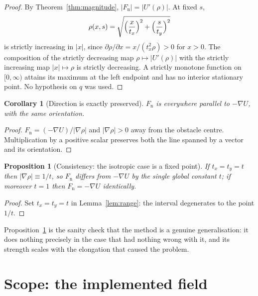 \documentclass[11pt]{article}
\newtheorem{proposition}[theorem]{Proposition}
\newtheorem{corollary}[theorem]{Corollary}
\theoremstyle{remark}
\begin{document}
\begin{proof}
By Theorem~\ref{thm:magnitude}, $|F_{\mathrm{n}}|=|U'(\rho)|$. At fixed $s$,
\begin{equation}
  \rho(x,s)=\sqrt{\Bigl(\frac{x}{t_{x}}\Bigr)^{2}+\Bigl(\frac{s}{t_{y}}\Bigr)^{2}}
\end{equation}
is strictly increasing in $|x|$, since $\partial\rho/\partial x = x/(t_{x}^{2}\rho)>0$
for $x>0$. The composition of the strictly decreasing map $\rho\mapsto|U'(\rho)|$
with the strictly increasing map $|x|\mapsto\rho$ is strictly decreasing.
A strictly monotone function on $[0,\infty)$ attains its maximum at the left
endpoint and has no interior stationary point. No hypothesis on $q$ was used.
\end{proof}

\begin{corollary}[Direction is exactly preserved]
\label{cor:direction}
$F_{\mathrm{n}}$ is everywhere parallel to $-\nabla U$, with the same
orientation.
\end{corollary}

\begin{proof}
$F_{\mathrm{n}} = (-\nabla U)\big/|\nabla\rho|$ and $|\nabla\rho|>0$ away from
the obstacle centre. Multiplication by a positive scalar preserves both the
line spanned by a vector and its orientation.
\end{proof}

\begin{proposition}[Consistency: the isotropic case is a fixed point]
\label{prop:isotropic}
If $t_{x}=t_{y}=t$ then $|\nabla\rho|\equiv 1/t$, so $F_{\mathrm{n}}$ differs
from $-\nabla U$ by the single global constant $t$; if moreover $t=1$ then
$F_{\mathrm{n}}=-\nabla U$ identically.
\end{proposition}

\begin{proof}
Set $t_{x}=t_{y}=t$ in Lemma~\ref{lem:range}: the interval degenerates to the
point $1/t$.
\end{proof}

\noindent
Proposition~\ref{prop:isotropic} is the sanity check that the method is a
genuine generalisation: it does nothing precisely in the case that had
nothing wrong with it, and its strength scales with the elongation that
caused the problem.

\section{Scope: the implemented field}
\label{sec:scope}
\end{document}
